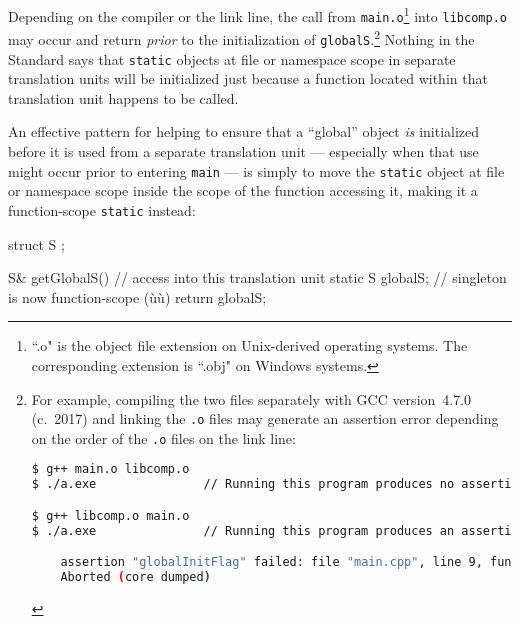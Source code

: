 \noindent Depending on the compiler or the link line, the call from \lstinline!main.o!\footnote{``.o" is the object file extension on Unix-derived operating systems. The corresponding extension is ``.obj" on Windows systems.} into \lstinline!libcomp.o! may occur and
return \emph{prior} to the initialization of
\lstinline!globalS!.{\cprotect\footnote{For example, compiling the two
files separately with GCC version~4.7.0 (c.~2017) and linking the
\lstinline!.o! files may generate an assertion error depending on the
order of the \lstinline!.o! files on the link line:

\begin{lstlisting}[language=bash,style=footcodeplain]
$ g++ main.o libcomp.o
$ ./a.exe               // Running this program produces no assertion failure.

$ g++ libcomp.o main.o
$ ./a.exe               // Running this program produces an assertion failure.

    assertion "globalInitFlag" failed: file "main.cpp", line 9, function: int main()
    Aborted (core dumped)
\end{lstlisting}
      }} Nothing in the Standard says that \lstinline!static! objects at
file or namespace scope in separate translation units will be
initialized just because a function located within that translation unit
happens to be called.

An effective pattern for helping to ensure that a ``global'' object
\emph{is} initialized before it is used from a separate translation unit
--- especially when that use might occur prior to entering \lstinline!main!
--- is simply to move the \lstinline!static! object at file or namespace
scope inside the scope of the function accessing it, making it a
function-scope \lstinline!static! instead:

\begin{emcppshiddenlisting}[emcppsbatch=e8]
struct S {
};
\end{emcppshiddenlisting}
\begin{emcppslisting}[emcppsbatch=e8]
S& getGlobalS()  // access into this translation unit
{
    static S globalS;  // singleton is now function-scope (ù{}ù)
    return globalS;
}
\end{emcppslisting}

